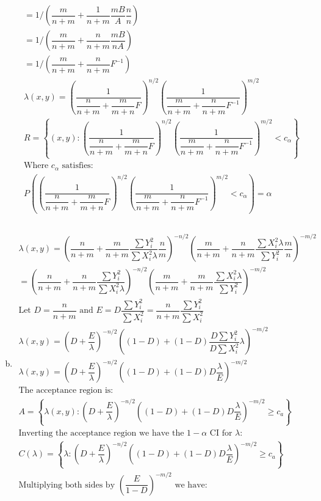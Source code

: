 \documentclass{article}
\newcommand{\lm}{\lambda}
\newcommand{\al}{\alpha}
\begin{document}
\begin{flushleft}
\begin{enumerate}[(a)]
\begin{multline*}
=1/\left(\dfrac{m}{n+m}+\dfrac{1}{n+m}\dfrac{mB}{A}\dfrac{n}{n}\right)\\
=1/\left(\dfrac{m}{n+m}+\dfrac{n}{n+m}\dfrac{mB}{nA}\right)\\
=1/\left(\dfrac{m}{n+m}+\dfrac{n}{n+m}F^{-1}\right)\\
\lm(x,y)=\left(\dfrac{1}{\dfrac{n}{n+m}+\dfrac{m}{m+n}F}\right)^{n/2}\left(\dfrac{1}{\dfrac{m}{n+m}+\dfrac{n}{n+m}F^{-1}}\right)^{m/2}\\
R=\left\{(x,y):\left(\dfrac{1}{\dfrac{n}{n+m}+\dfrac{m}{m+n}F}\right)^{n/2}\left(\dfrac{1}{\dfrac{m}{n+m}+\dfrac{n}{n+m}F^{-1}}\right)^{m/2}<c_\alpha \right\}\\
\text{Where } c_\al \text{ satisfies:}\\
P\left(\left(\dfrac{1}{\dfrac{n}{n+m}+\dfrac{m}{m+n}F}\right)^{n/2}\left(\dfrac{1}{\dfrac{m}{n+m}+\dfrac{n}{n+m}F^{-1}}\right)^{m/2}<c_\alpha\right)=\al\\
\end{multline*}
	\item 
\begin{multline*}\\
\lm(x,y)=\left(\dfrac{n}{n+m}+\dfrac{m}{n+m}\dfrac{\sum Y_i^2}{\sum X_i^2\lm}\dfrac{n}{m}\right)^{-n/2} \left(\dfrac{m}{n+m}+\dfrac{n}{n+m}\dfrac{\sum X_i^2\lm}{\sum Y_i^2}\dfrac{m}{n}\right)^{-m/2}\\
=\left(\dfrac{n}{n+m}+\dfrac{n}{n+m}\dfrac{\sum Y_i^2}{\sum X_i^2\lm}\right)^{-n/2} \left(\dfrac{m}{n+m}+\dfrac{m}{n+m}\dfrac{\sum X_i^2\lm}{\sum Y_i^2}\right)^{-m/2}\\
\text{Let } D=\dfrac{n}{n+m} \text{ and } E=D\dfrac{\sum Y_i^2}{\sum X_i^2}=\dfrac{n}{n+m}\dfrac{\sum Y_i^2}{\sum X_i^2}\\
\lm(x,y)=\left(D+\dfrac{E}{\lm}\right)^{-n/2}\left((1-D)+(1-D)\dfrac{D\sum Y_i^2}{D\sum X_i^2}\lm\right)^{-m/2}\\
\lm(x,y)=\left(D+\dfrac{E}{\lm}\right)^{-n/2}\left((1-D)+(1-D)D\dfrac{\lm}{E}\right)^{-m/2}\\
\text{The acceptance region is:}\\
A=\left\{\lm(x,y):\left(D+\dfrac{E}{\lm}\right)^{-n/2}\left((1-D)+(1-D)D\dfrac{\lm}{E}\right)^{-m/2}\geq c_a\right\}\\
\text{Inverting the acceptance region we have the } 1-\al \text{ CI for } \lm:\\
C(\lm)=\left\{\lm:\left(D+\dfrac{E}{\lm}\right)^{-n/2}\left((1-D)+(1-D)D\dfrac{\lm}{E}\right)^{-m/2}\geq c_a\right\}\\
\text{Multiplying both sides by } \left(\dfrac{E}{1-D}\right)^{-m/2} \text{ we have:}\\

\end{multline*}
\end{enumerate}
\end{flushleft}
\end{document}
